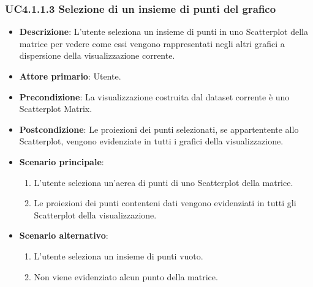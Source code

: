 \subsubsection{UC4.1.1.3 Selezione di un insieme di punti del grafico}
\label{subsec:uc4.1.1}
\begin{itemize}
    \item \textbf{Descrizione}: L'utente seleziona un insieme di punti in uno Scatterplot della matrice per vedere come 
                                essi vengono rappresentati negli altri grafici a dispersione della visualizzazione corrente.
	
    \item \textbf{Attore primario}: Utente.
    
    \item \textbf{Precondizione}:   La visualizzazione costruita dal dataset corrente è uno Scatterplot Matrix.
    \item \textbf{Postcondizione}:  Le proiezioni dei punti selezionati, se appartentente allo Scatterplot, 
                                    vengono evidenziate in tutti i grafici della visualizzazione.

	\item \textbf{Scenario principale}:
        \begin{enumerate}
            \item L'utente seleziona un'aerea di punti di uno Scatterplot della matrice.
            \item Le proiezioni dei punti contenteni dati vengono evidenziati in tutti gli Scatterplot della visualizzazione.
        \end{enumerate}

    \item \textbf{Scenario alternativo}:
        \begin{enumerate}
            \item L'utente seleziona un insieme di punti vuoto.
            \item Non viene evidenziato alcun punto della matrice.
        \end{enumerate}

\end{itemize}


\newpage

